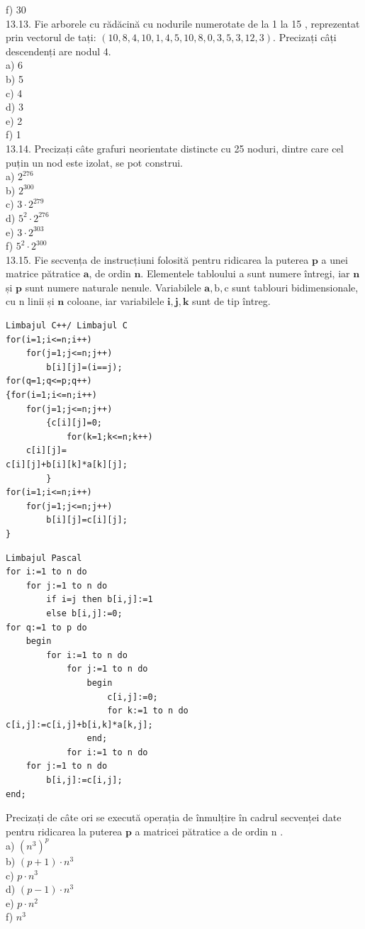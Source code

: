 {{f) 30
\\
13.13. Fie arborele cu rădăcină cu nodurile numerotate de la 1 la 15 , reprezentat prin vectorul de tați: $(10,8,4,10,1,4,5,10,8,0,3,5,3,12,3)$. Precizați câți descendenți are nodul 4.
\\
a) 6
\\
b) 5
\\
c) 4
\\
d) 3
\\
e) 2
\\
f) 1
\\
13.14. Precizați câte grafuri neorientate distincte cu 25 noduri, dintre care cel puțin un nod este izolat, se pot construi.
\\
a) $2^{276}$
\\
b) $2^{300}$
\\
c) $3 \cdot 2^{279}$
\\
d) $5^{2} \cdot 2^{276}$
\\
e) $3 \cdot 2^{303}$
\\
f) $5^{2} \cdot 2^{300}$
\\
13.15. Fie secvența de instrucțiuni folosită pentru ridicarea la puterea $\mathbf{p}$ a unei matrice pătratice $\mathbf{a}$, de ordin $\mathbf{n}$. Elementele tabloului a sunt numere întregi, iar $\mathbf{n}$ și $\mathbf{p}$ sunt numere naturale nenule. Variabilele $\mathbf{a}, \mathrm{b}, \mathrm{c}$ sunt tablouri bidimensionale, cu n linii și $\mathbf{n}$ coloane, iar variabilele $\mathbf{i}, \mathbf{j}, \mathbf{k}$ sunt de tip întreg.
\begin{verbatim}
Limbajul C++/ Limbajul C
for(i=1;i<=n;i++)
    for(j=1;j<=n;j++)
        b[i][j]=(i==j);
for(q=1;q<=p;q++)
{for(i=1;i<=n;i++)
    for(j=1;j<=n;j++)
        {c[i][j]=0;
            for(k=1;k<=n;k++)
    c[i][j]=
c[i][j]+b[i][k]*a[k][j];
        }
for(i=1;i<=n;i++)
    for(j=1;j<=n;j++)
        b[i][j]=c[i][j];
}
\end{verbatim}
\begin{verbatim}
Limbajul Pascal
for i:=1 to n do
    for j:=1 to n do
        if i=j then b[i,j]:=1
        else b[i,j]:=0;
for q:=1 to p do
    begin
        for i:=1 to n do
            for j:=1 to n do
                begin
                    c[i,j]:=0;
                    for k:=1 to n do
c[i,j]:=c[i,j]+b[i,k]*a[k,j];
                end;
            for i:=1 to n do
    for j:=1 to n do
        b[i,j]:=c[i,j];
end;
\end{verbatim}
Precizați de câte ori se execută operația de înmulțire în cadrul secvenței date pentru ridicarea la puterea $\mathbf{p}$ a matricei pătratice a de ordin n .
\\
a) $\left(n^{3}\right)^{p}$
\\
b) $(p+1) \cdot n^{3}$
\\
c) $p \cdot n^{3}$
\\
d) $(p-1) \cdot n^{3}$
\\
e) $p \cdot n^{2}$
\\
f) $n^{3}$
\\

}}

